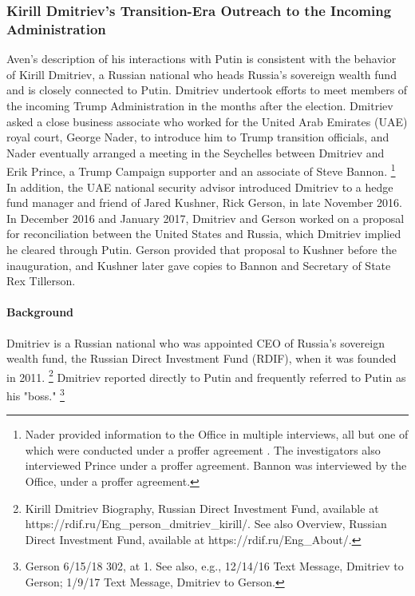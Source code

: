 \subsubsection{Kirill Dmitriev's Transition-Era Outreach to the Incoming Administration}

Aven's description of his interactions with Putin is consistent with the behavior of Kirill Dmitriev, a Russian national who heads Russia's sovereign wealth fund and is closely connected to Putin.
Dmitriev undertook efforts to meet members of the incoming Trump Administration in the months after the election.
Dmitriev asked a close business associate who worked for the United Arab Emirates (UAE) royal court, George Nader, to introduce him to Trump transition officials, and Nader eventually arranged a meeting in the Seychelles between Dmitriev and Erik Prince, a Trump Campaign supporter and an associate of Steve Bannon.%
\footnote{Nader provided information to the Office in multiple interviews, all but one of which were conducted under a proffer agreement .
The investigators also interviewed Prince under a proffer agreement.
Bannon was interviewed by the Office,  under a proffer agreement.}
In addition, the UAE national security advisor introduced Dmitriev to a hedge fund manager and friend of Jared Kushner, Rick Gerson, in late November 2016.
In December 2016 and January 2017, Dmitriev and Gerson worked on a proposal for reconciliation between the United States and Russia, which Dmitriev implied he cleared through Putin.
Gerson provided that proposal to Kushner before the inauguration, and Kushner later gave copies to Bannon and Secretary of State Rex Tillerson.

\paragraph{Background}

Dmitriev is a Russian national who was appointed CEO of Russia's sovereign wealth fund, the Russian Direct Investment Fund (RDIF), when it was founded in 2011.%
\footnote{Kirill Dmitriev Biography, Russian Direct Investment Fund, available at https://rdif.ru/Eng_person_dmitriev_kirill/.
See also Overview, Russian Direct Investment Fund, available at https://rdif.ru/Eng_About/.}
Dmitriev reported directly to Putin and frequently referred to Putin as his "boss."%
\footnote{Gerson 6/15/18 302, at 1.
See also, e.g., 12/14/16 Text Message, Dmitriev to Gerson;
1/9/17 Text Message, Dmitriev to Gerson.}

